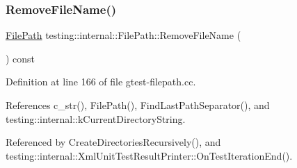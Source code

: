 \subsubsection{\texorpdfstring{Remove\+File\+Name()}{RemoveFileName()}}
{\footnotesize\ttfamily \hyperlink{classtesting_1_1internal_1_1FilePath}{File\+Path} testing\+::internal\+::\+File\+Path\+::\+Remove\+File\+Name (\begin{DoxyParamCaption}{ }\end{DoxyParamCaption}) const}



Definition at line 166 of file gtest-\/filepath.\+cc.



References c\+\_\+str(), File\+Path(), Find\+Last\+Path\+Separator(), and testing\+::internal\+::k\+Current\+Directory\+String.



Referenced by Create\+Directories\+Recursively(), and testing\+::internal\+::\+Xml\+Unit\+Test\+Result\+Printer\+::\+On\+Test\+Iteration\+End().


